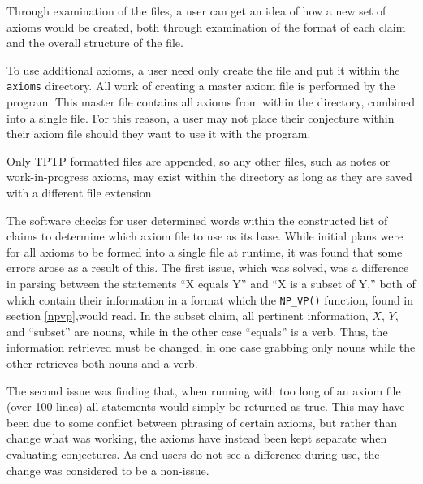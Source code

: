 Through examination of the files, a user can get an idea of how a new set of axioms would be created, both through examination of the format of each claim and the overall structure of the file.

To use additional axioms, a user need only create the file and put it within the \texttt{axioms} directory. All work of creating a master axiom file is performed by the program. This master file contains all axioms from within the directory, combined into a single file. For this reason, a user may not place their conjecture within their axiom file should they want to use it with the program.

Only TPTP formatted files are appended, so any other files, such as notes or work-in-progress axioms, may exist within the directory as long as they are saved with a different file extension.

The software checks for user determined words within the constructed list of claims to determine which axiom file to use as its base. While initial plans were for all axioms to be formed into a single file at runtime, it was found that some errors arose as a result of this. The first issue, which was solved, was a difference in parsing between the statements ``X equals Y'' and ``X is a subset of Y,'' both of which contain their information in a format which the \texttt{NP\_VP()} function, found in section \ref{npvp},would read. In the subset claim, all pertinent information, $X$, $Y$, and ``subset'' are nouns, while in the other case ``equals'' is a verb. Thus, the information retrieved must be changed, in one case grabbing only nouns while the other retrieves both nouns and a verb.

The second issue was finding that, when running with too long of an axiom file (over 100 lines) all statements would simply be returned as true. This may have been due to some conflict between phrasing of certain axioms, but rather than change what was working, the axioms have instead been kept separate when evaluating conjectures. As end users do not see a difference during use, the change was considered to be a non-issue.
